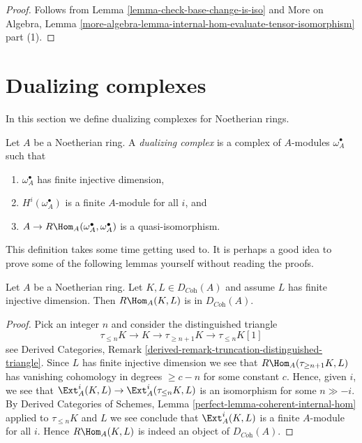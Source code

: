 \begin{proof}
Follows from Lemma \ref{lemma-check-base-change-is-iso} and
More on Algebra, Lemma
\ref{more-algebra-lemma-internal-hom-evaluate-tensor-isomorphism} part (1).
\end{proof}







\section{Dualizing complexes}
\label{section-dualizing}

\noindent
In this section we define dualizing complexes for Noetherian rings.

\begin{definition}
\label{definition-dualizing}
Let $A$ be a Noetherian ring. A {\it dualizing complex} is a
complex of $A$-modules $\omega_A^\bullet$ such that
\begin{enumerate}
\item $\omega_A^\bullet$ has finite injective dimension,
\item $H^i(\omega_A^\bullet)$ is a finite $A$-module for all $i$, and
\item $A \to R\Hom_A(\omega_A^\bullet, \omega_A^\bullet)$
is a quasi-isomorphism.
\end{enumerate}
\end{definition}

\noindent
This definition takes some time getting used to. It is perhaps a good
idea to prove some of the following lemmas yourself without reading
the proofs.

\begin{lemma}
\label{lemma-finite-ext-into-bounded-injective}
Let $A$ be a Noetherian ring. Let $K, L \in D_{\textit{Coh}}(A)$
and assume $L$ has finite injective dimension. Then
$R\Hom_A(K, L)$ is in $D_{\textit{Coh}}(A)$.
\end{lemma}

\begin{proof}
Pick an integer $n$ and consider the distinguished triangle
$$
\tau_{\leq n}K \to K \to \tau_{\geq n + 1}K \to \tau_{\leq n}K[1]
$$
see Derived Categories, Remark
\ref{derived-remark-truncation-distinguished-triangle}.
Since $L$ has finite injective dimension we see
that $R\Hom_A(\tau_{\geq n + 1}K, L)$ has vanishing
cohomology in degrees $\geq c - n$ for some constant $c$.
Hence, given $i$, we see that
$\Ext^i_A(K, L) \to \Ext^i_A(\tau_{\leq n}K, L)$
is an isomorphism for some $n \gg - i$. By
Derived Categories of Schemes, Lemma \ref{perfect-lemma-coherent-internal-hom}
applied to $\tau_{\leq n}K$ and $L$
we see conclude that $\Ext^i_A(K, L)$ is
a finite $A$-module for all $i$. Hence $R\Hom_A(K, L)$
is indeed an object of $D_{\textit{Coh}}(A)$.
\end{proof}

